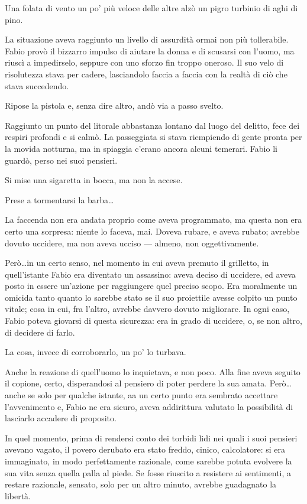 Una folata di vento un po' più veloce delle altre alzò un pigro turbinio di aghi di pino.

La situazione aveva raggiunto un livello di assurdità ormai non più tollerabile. Fabio provò il bizzarro impulso di aiutare la donna e di scusarsi con l'uomo, ma riuscì a impedirselo, seppure con uno sforzo fin troppo oneroso. Il suo velo di risolutezza stava per cadere, lasciandolo faccia a faccia con la realtà di ciò che stava succedendo. 

Ripose la pistola e, senza dire altro, andò via a passo svelto.

Raggiunto un punto del litorale abbastanza lontano dal luogo del delitto, fece dei respiri profondi e si calmò. La passeggiata si stava riempiendo di gente pronta per la movida notturna, ma in spiaggia c'erano ancora alcuni temerari. Fabio li guardò, perso nei suoi pensieri. 

Si mise una sigaretta in bocca, ma non la accese. 

Prese a tormentarsi la barba\ldots

La faccenda non era andata proprio come aveva programmato, ma questa non era certo una sorpresa: niente lo faceva, mai. Doveva rubare, e aveva rubato; avrebbe dovuto uccidere, ma non aveva ucciso --- almeno, non oggettivamente. 

Però\ldots \thinspace in un certo senso, nel momento in cui aveva premuto il grilletto, in quell'istante Fabio era diventato un assassino: aveva deciso di uccidere, ed aveva posto in essere un'azione per raggiungere quel preciso scopo. Era moralmente un omicida tanto quanto lo sarebbe stato se il suo proiettile avesse colpito un punto vitale; cosa in cui, fra l'altro, avrebbe davvero dovuto migliorare. In ogni caso, Fabio poteva giovarsi di questa sicurezza: era in grado di uccidere, o, se non altro, di decidere di farlo. 

La cosa, invece di corroborarlo, un po' lo turbava.

Anche la reazione di quell'uomo lo inquietava, e non poco. Alla fine aveva seguito il copione, certo, disperandosi al pensiero di poter perdere la sua amata. Però\ldots \thinspace anche se solo per qualche istante, aa un certo punto era sembrato accettare l'avvenimento e, Fabio ne era sicuro, aveva addirittura valutato la possibilità di lasciarlo accadere di proposito. 

In quel momento, prima di rendersi conto dei torbidi lidi nei quali i suoi pensieri avevano vagato, il povero derubato era stato freddo, cinico, calcolatore: si era immaginato, in modo perfettamente razionale, come sarebbe potuta evolvere la sua vita senza quella palla al piede. Se fosse riuscito a resistere ai sentimenti, a restare razionale, sensato, solo per un altro minuto, avrebbe guadagnato la libertà. 

